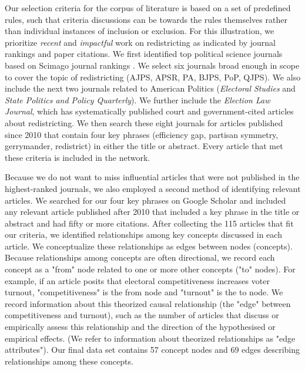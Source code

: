 \documentclass{cup-pan}
\begin{document}
Our selection criteria for the corpus of literature is based on a set of predefined rules, such that criteria discussions can be towards the rules themselves rather than individual instances of inclusion or exclusion. For this illustration, we prioritize \textit{recent} and \textit{impactful} work on redistricting as indicated by journal rankings and paper citations. We first identified top political science journals based on Scimago journal rankings \citep{scimago_rank_2020}. We select six journals broad enough in scope to cover the topic of redistricting (AJPS, APSR, PA, BJPS, PoP, QJPS). We also include the next two journals related to American Politics (\textit{Electoral Studies} and \textit{State Politics and Policy Quarterly}). We further include the \textit{Election Law Journal}, which has  systematically published court and government-cited articles about redistricting. We then search these eight journals for articles published since 2010 that contain four key phrases (efficiency gap, partisan symmetry, gerrymander, redistrict) in either the title or abstract. Every article that met these criteria is included in the network.\par 
Because we do not want to miss influential articles that were not published in the highest-ranked journals, we also employed a second method of identifying relevant articles. We searched for our four key phrases on Google Scholar and included any relevant article published after 2010 that included a key phrase in the title or abstract and had fifty or more citations. 
After collecting the 115 articles that fit our criteria, we identified relationships among key concepts discussed in each article. We conceptualize these relationships as edges between nodes (concepts). Because relationships among concepts are often directional, we record each concept as a "from" node related to one or more other concepts ("to" nodes). For example, if an article posits that electoral competitiveness increases voter turnout, "competitiveness" is the from node and "turnout" is the to node. We record information about this theorized causal relationship (the "edge" between competitiveness and turnout), such as the number of articles that discuss or empirically assess this relationship and the direction of the hypothesised or empirical effects. (We refer to information about theorized relationships as "edge attributes"). Our final data set contains 57 concept nodes and 69 edges describing relationships among these concepts.\par 
\end{document}
